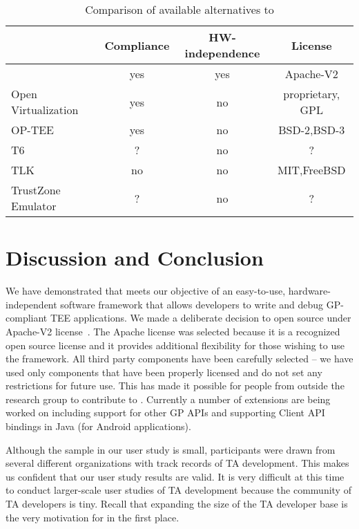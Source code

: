 \documentclass[10pt,conference,letterpaper]{IEEEtran}
\newcommand{\opentee}{\protect{TEE-Vi}\xspace}
\newcommand{\opentee}{\protect{Open-TEE}\xspace}
\begin{document}
\begin{table}
\centering
\caption{Comparison of available alternatives to \opentee}
\label{tab:alternatives}
\begin{tabular}{l c c c}
  & Compliance & HW-independence & License \\
  \hline
  \opentee & yes & yes & Apache-V2 \\
  \rowcolor{black!15} \cellcolor{black!15}Open Virtualization~\cite{web:openVirtua} & yes & no & proprietary, GPL \\
  OP-TEE~\cite{web:linaro_op_tee}  & yes & no & BSD-2,BSD-3 \\
  \rowcolor{black!15} \cellcolor{black!15}T6~\cite{web:T6} & ? & no & ? \\
  TLK~\cite{web:NVIDIA_TLK} & no & no & MIT,FreeBSD \\
  \rowcolor{black!15} \cellcolor{black!15}TrustZone Emulator~\cite{WinterWPT11} & ? & no & ? \\
\hline
\end{tabular}
\end{table}
 
\section{Discussion and Conclusion}

We have demonstrated that \opentee meets our objective of an easy-to-use, hardware-independent software framework that allows developers to write and debug GP-compliant TEE applications. We made a deliberate decision to open source \opentee under Apache-V2 license~\cite{web:Apache-v2}. The Apache license was selected because it is a recognized open source license and it provides additional flexibility for those wishing to use the framework. All third party components have been carefully selected -- we have used only components that have been properly licensed and do not set any restrictions for future use. This has made it possible for people from outside the research group to contribute to \opentee. Currently a number of extensions are being worked on including support for other GP APIs and supporting Client API bindings in Java (for Android applications).

Although the sample in our user study is small, participants were drawn from several different organizations with track records of TA development. This makes us confident that our user study results are valid. It is very difficult at this time to conduct larger-scale user studies of TA development because the community of TA developers is tiny. Recall that expanding the size of the TA developer base is the very motivation for \opentee in the first place.
\end{document}
